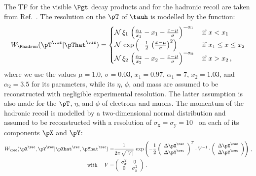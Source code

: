 The TF for the visible $\Pgt$ decay products and for the hadronic recoil are taken from Ref.~\cite{SVfitMEM}.
The resolution on the $\pT$ of $\tauh$ is modelled by the function:
\begin{equation}
W_{\Phadron}( \pT^{\vis} | \pThat^{\vis} ) = 
 \begin{cases}
   \mathcal{N} \, \xi_{1} \, \left( \frac{\alpha_{1}}{x_{1}} - x_{1} - \frac{x - \mu}{\sigma} \right)^{-\alpha_{1}} \,  
 & \mbox{if } x < x_{1} \\
   \mathcal{N} \, \exp\left( -\frac{1}{2} \, \left( \frac{x - \mu}{\sigma} \right)^{2} \right) \,
 & \mbox{if } x_{1} \leq x \leq x_{2} \\
   \mathcal{N} \, \xi_{2} \, \left( \frac{\alpha_{2}}{x_{2}} - x_{2} - \frac{x - \mu}{\sigma} \right)^{-\alpha_{2}} \, 
 & \mbox{if } x > x_{2} \, ,
 \end{cases}
\label{eq:tf_tauToHadDecays_pT}
\end{equation}
where we use the values $\mu = 1.0$, $\sigma = 0.03$, $x_{1} = 0.97$, $\alpha_{1} = 7$,
$x_{2} = 1.03$, and $\alpha_{2} = 3.5$ for its parameters,
while its $\eta$, $\phi$, and mass are assumed to be reconstructed with negligible experimental resolution.
The latter assumption is also made for the $\pT$, $\eta$, and $\phi$ of electrons and muons.
The momentum of the hadronic recoil is modelled by a two-dimensional normal distribution
and assumed to be reconstructed with a resolution of $\sigma_{\textrm{x}} = \sigma_{\textrm{y}} = 10$~\GeV 
on each of its components $\pX$ and $\pY$:
\begin{align}
W_{\rec}( \pX^{\rec},\pY^{\rec} | \pXhat^{\rec},\pYhat^{\rec} ) = & 
\frac{1}{2\pi \, \sqrt{\vert V \vert}} \, \exp \left( -\frac{1}{2}
  \left( \begin{array}{c} \Delta\pX^{\rec} \\ \Delta\pY^{\rec} \end{array} \right)^{T}
  \cdot V^{-1} \cdot
   \left( \begin{array}{c} \Delta\pX^{\rec} \\ \Delta\pY^{\rec} \end{array} \right)
  \right) \, , \nonumber \\
\quad \mbox{ with } \quad V = & \left( \begin{array}{cc} \sigma_{x}^{2} & 0 \\ 0 & \sigma_{y}^{2} \end{array} \right) \, .
\end{align}


